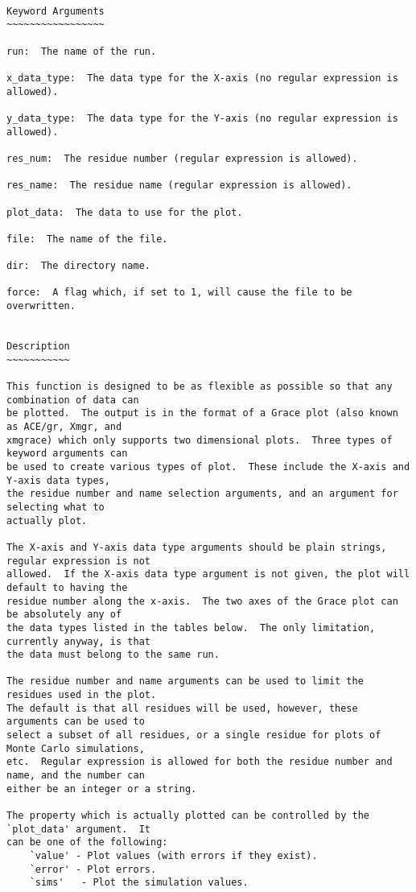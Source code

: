 {\scriptsize
\begin{verbatim}

Keyword Arguments
~~~~~~~~~~~~~~~~~

run:  The name of the run.

x_data_type:  The data type for the X-axis (no regular expression is allowed).

y_data_type:  The data type for the Y-axis (no regular expression is allowed).

res_num:  The residue number (regular expression is allowed).

res_name:  The residue name (regular expression is allowed).

plot_data:  The data to use for the plot.

file:  The name of the file.

dir:  The directory name.

force:  A flag which, if set to 1, will cause the file to be overwritten.


Description
~~~~~~~~~~~

This function is designed to be as flexible as possible so that any combination of data can
be plotted.  The output is in the format of a Grace plot (also known as ACE/gr, Xmgr, and
xmgrace) which only supports two dimensional plots.  Three types of keyword arguments can
be used to create various types of plot.  These include the X-axis and Y-axis data types,
the residue number and name selection arguments, and an argument for selecting what to
actually plot.

The X-axis and Y-axis data type arguments should be plain strings, regular expression is not
allowed.  If the X-axis data type argument is not given, the plot will default to having the
residue number along the x-axis.  The two axes of the Grace plot can be absolutely any of
the data types listed in the tables below.  The only limitation, currently anyway, is that
the data must belong to the same run.

The residue number and name arguments can be used to limit the residues used in the plot.
The default is that all residues will be used, however, these arguments can be used to
select a subset of all residues, or a single residue for plots of Monte Carlo simulations,
etc.  Regular expression is allowed for both the residue number and name, and the number can
either be an integer or a string.

The property which is actually plotted can be controlled by the `plot_data' argument.  It
can be one of the following:
    `value' - Plot values (with errors if they exist).
    `error' - Plot errors.
    `sims'   - Plot the simulation values.



\end{verbatim}}
